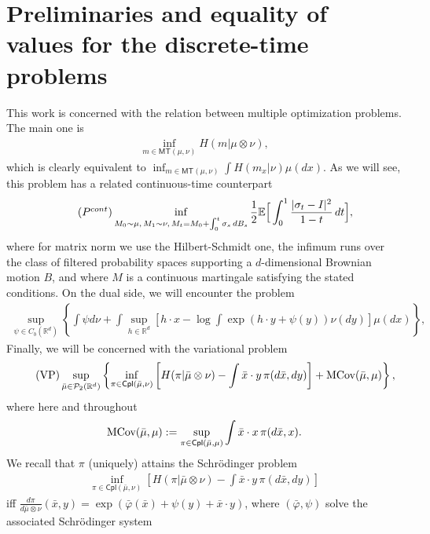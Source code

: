 \documentclass[reqno, a4paper]{amsart}
\theoremstyle{plain}
\theoremstyle{definition}
\theoremstyle{remark}
\numberwithin{equation}{section}
\numberwithin{theorem}{section}
\newcommand{\Rd}{\mathbb{R}^{d}}
\newcommand{\MT}{\mathsf{MT}}
\newcommand{\Cpl}{\mathsf{Cpl}}
\newcommand{\MCov}{\textnormal{MCov}}
\newcommand{\PP}{\mathcal{P}}
\begin{document}
	
	
	
	\section{Preliminaries and equality of values for the discrete-time problems}
	\label{sec:eq-discrete}
	
	This work is concerned with the relation between multiple optimization problems. The main one is
	\begin{align}\tag{P}
		\inf_{m\in\MT(\mu,\nu)} H(m|\mu\otimes \nu),
	\end{align}
	which is clearly equivalent to $\inf_{m\in\MT(\mu,\nu)} \int H(m_x|\nu)\mu(dx)$. 
	As we will see, this problem has a related continuous-time counterpart
	\begin{align}\tag{$P^{cont}$}
		\inf_{\substack{M_{0} \sim \mu, \, M_{1} \sim \nu, \, M_{t} = M_{0} + \int_{0}^{t}  \sigma_{s} \, dB_{s}}} \frac{1}{2}
		\mathbb{E}\Big[\int_{0}^{1} \frac{\vert \sigma_{t} - I \vert^{2}}{1-t} \, dt\Big],
	\end{align}
	where for matrix norm we use the Hilbert-Schmidt one,  the infimum runs over the class of filtered probability spaces supporting a $d$-dimensional Brownian motion $B$, and where $M$ is a continuous martingale satisfying the stated conditions.
	On the dual side, we will encounter the problem
	\begin{align}\label{eq:main_dual}\tag{D}
		\sup_{\psi\in C_b(\Rd)}\left\{\int\psi d\nu +\int  \sup_{h\in\Rd}\left[ h\cdot x-\log\int\exp(h\cdot y+\psi(y))\nu(dy) \right ] \mu(dx)\right\},
	\end{align}
	Finally, we will be concerned with the variational problem
	\begin{align}\tag{VP}
		\sup_{\bar\mu\in\PP_2(\Rd)}\left\{ \inf_{\pi\in \Cpl(\bar\mu,\nu) }\left[ H(\pi|\bar\mu \otimes \nu)-\int \bar x\cdot y \,\pi(d\bar x,dy) \right] + \MCov(\bar\mu,\mu)  \right\},
	\end{align}
	where here and throughout $$\MCov(\bar\mu,\mu):=\sup_{\pi\in\Cpl(\bar\mu,\mu)}\int \bar x\cdot x\,\pi(d\bar x,x).$$
	We recall that $\pi$ (uniquely) attains the Schrödinger problem 
	\begin{align}
		\inf_{\pi\in \Cpl(\bar\mu,\nu) }\left[H(\pi|\bar\mu\otimes \nu) - \int \bar x\cdot y \,\pi(d\bar x,dy)\right] \label{eq:SP}\tag{$SP(\bar \mu,\nu)$}
	\end{align} iff $\frac{d\pi}{d\bar\mu \otimes \nu}(\bar x,y)= \exp( \bar\varphi(\bar x) + \psi(y) +\bar x\cdot y)$, where $(\bar\varphi,\psi)$ solve the associated Schrödinger system
\end{document}
